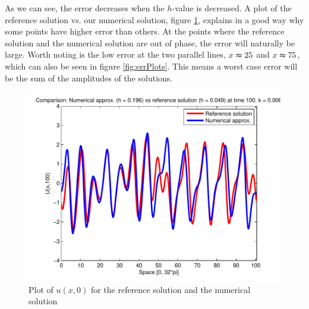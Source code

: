 As we can see, the error decreases when the $h$-value is decreased. A plot of the reference solution vs. our numerical solution, figure \ref{fig:errTime}, explains in a good way why some points have higher error than others. At the points where the reference solution and the numerical solution are out of phase, the error will naturally be large. Worth noting is the low error at the two parallel lines, $x \thickapprox 25$ and $x \thickapprox 75$, which can also be seen in figure \ref{fig:errPlots}. This means a worst case error will be the sum of the amplitudes of the solutions.

\begin{figure}[H]
\centering
\includegraphics[scale=0.55]
{PDFs/IMEX/comp_num_ref_t100.pdf}
\caption{Plot of $u(x,0)$ for the reference solution and the numerical solution}
\label{fig:errTime}
\end{figure}